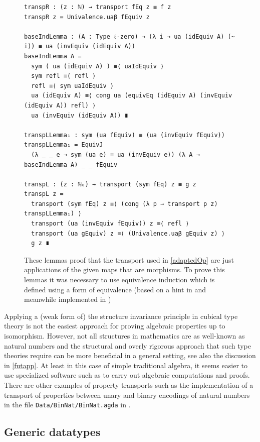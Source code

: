 \documentclass[12pt,a4paper,twoside,xetex]{book} %
\begin{document}
\begin{figure}\label{leftrighttransp}
 \begin{center}
  \begin{BVerbatim}
transpR : (z : ℕ) → transport fEq z ≡ f z
transpR z = Univalence.uaβ fEquiv z

baseIndLemma : (A : Type ℓ-zero) → (λ i → ua (idEquiv A) (~ i)) ≡ ua (invEquiv (idEquiv A))
baseIndLemma A = 
  sym ( ua (idEquiv A) ) ≡⟨ uaIdEquiv ⟩
  sym refl ≡⟨ refl ⟩
  refl ≡⟨ sym uaIdEquiv ⟩
  ua (idEquiv A) ≡⟨ cong ua (equivEq (idEquiv A) (invEquiv (idEquiv A)) refl) ⟩
  ua (invEquiv (idEquiv A)) ∎

transpLLemma₁ : sym (ua fEquiv) ≡ (ua (invEquiv fEquiv))
transpLLemma₁ = EquivJ
  (λ _ _ e → sym (ua e) ≡ ua (invEquiv e)) (λ A → baseIndLemma A) _ _ fEquiv 

transpL : (z : ℕ₀) → transport (sym fEq) z ≡ g z
transpL z =
  transport (sym fEq) z ≡⟨ (cong (λ p → transport p z) transpLLemma₁) ⟩
  transport (ua (invEquiv fEquiv)) z ≡⟨ refl ⟩
  transport (ua gEquiv) z ≡⟨ (Univalence.uaβ gEquiv z) ⟩
  g z ∎
  \end{BVerbatim}

 \end{center}
\caption{These lemmas proof that the transport used in \cref{adaptedOp} are just applications of the given maps that are morphisms. To prove this lemmas it was necessary to use equivalence induction which is defined using a form of equivalence (based on a hint in \cite{Vez19} and meanwhile implemented in \cite{Moertberg2018})}
\end{figure}


Applying a (weak form of) the structure invariance principle in cubical type theory is not the easiest approach for proving algebraic properties up to isomorphism. However, not all structures in mathematics are as well-known as natural numbers and the structural and overly 
rigorous approach that such type theories require can be more beneficial in a 
general setting, see also the discussion in \cref{futapp}.  At least in this case of simple traditional algebra, it seems 
easier to use specialized software such as \cite{TheGAPGroup2018} to carry out 
algebraic computations and proofs. There are other examples of property transports such as the implementation of a transport of properties between unary and binary encodings of natural numbers in the file \texttt{Data/BinNat/BinNat.agda} in \cite{Moertberg2018}.


\subsection{Generic datatypes}
\end{document}
